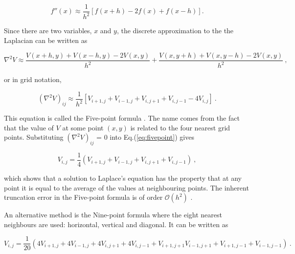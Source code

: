 \documentclass[a4paper]{jpconf}
\begin{document}
\begin{equation}
f''(x) \approx \frac{1}{h^2}[f(x+h) - 2f(x) + f(x-h)].
\end{equation}

\noindent Since there are two variables, $x$ and $y$, the discrete approximation to the the Laplacian can be written as

\begin{equation}
\nabla^2 V \approx \frac{V(x+h,y) + V(x-h,y) - 2V(x,y)}{h^2} + \frac{V(x,y+h) + V(x,y-h) - 2V(x,y)}{h^2}~,
\end{equation}

\noindent or in grid notation,

\begin{equation}
(\nabla^2 V)_{ij} \approx \frac{1}{h^2}[V_{i+1,j} + V_{i-1,j} + V_{i,j+1} + V_{i,j-1} - 4V_{i,j}]~.
\label{eq:fivepoint}
\end{equation}

\noindent This equation is called the Five-point formula \cite{Cheney.Kincai-NumericalMethods}. The name comes from the fact that the value of $V$ at some point $(x,y)$ is related to the four nearest grid points. Substituting $(\nabla^2 V)_{ij}$ = 0 into Eq.(\ref{eq:fivepoint}) gives 

\begin{equation}
V_{i,j} = \frac{1}{4}(V_{i+1,j} + V_{i-1,j} + V_{i,j+1} + V_{i,j-1})~,
\end{equation}

\noindent which shows that a solution to Laplace's equation has the property that at any point it is equal to the average of the values at neighbouring points. The inherent truncation error in the Five-point formula is of order $\mathcal{O}(h^2)$ \cite{Cheney.Kincai-NumericalMethods}.  \par

An alternative method is the Nine-point formula where the eight nearest neighbours are used: horizontal, vertical and diagonal. It can be written as


\begin{equation}
V_{i,j} = \frac{1}{20}(4V_{i+1,j} + 4V_{i-1,j} + 4V_{i,j+1} + 4V_{i,j-1} + V_{i+1,j+1} V_{i-1,j+1} + V_{i+1,j-1} + V_{i-1,j-1})~.
\end{equation}
\end{document}
